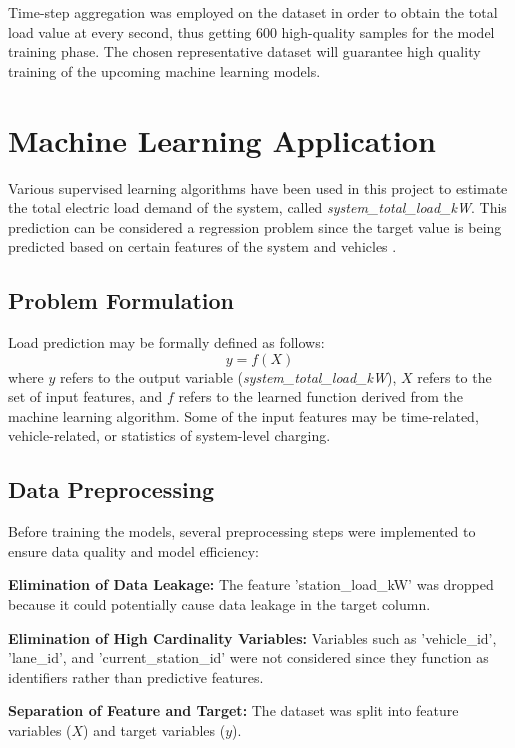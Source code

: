 \documentclass{thesis-library}
\begin{document}
Time-step aggregation was employed on the dataset in order to obtain the total load value at every second, thus getting 600 high-quality samples for the model training phase. The chosen representative dataset will guarantee high quality training of the upcoming machine learning models.

\section{Machine Learning Application}

Various supervised learning algorithms have been used in this project to estimate the total electric load demand of the system, called \textit{system\_total\_load\_kW}. This prediction can be considered a regression problem since the target value is being predicted based on certain features of the system and vehicles \cite{regression_ev2020, kyriakopoulos_experimental_2026}.

\subsection{Problem Formulation}
Load prediction may be formally defined as follows:
\begin{equation}
    y = f(X)
\end{equation}
where $y$ refers to the output variable (\textit{system\_total\_load\_kW}), $X$ refers to the set of input features, and $f$ refers to the learned function derived from the machine learning algorithm. Some of the input features may be time-related, vehicle-related, or statistics of system-level charging.

\subsection{Data Preprocessing}

Before training the models, several preprocessing steps were implemented to ensure data quality and model efficiency:

\noindent \textbf{Elimination of Data Leakage:} The feature 'station\_load\_kW' was dropped because it could potentially cause data leakage in the target column.

\noindent \textbf{Elimination of High Cardinality Variables:} Variables such as 'vehicle\_id', 'lane\_id', and 'current\_station\_id' were not considered since they function as identifiers rather than predictive features.

\noindent \textbf{Separation of Feature and Target:} The dataset was split into feature variables ($X$) and target variables ($y$).
\end{document}
